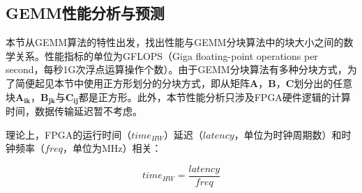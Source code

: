 \subsection{GEMM性能分析与预测}\label{subsec:predict}

本节从GEMM算法的特性出发，找出性能与GEMM分块算法中的块大小之间的数学关系。性能指标的单位为GFLOPS（Giga floating-point operations per second，每秒1G次浮点运算操作个数）。由于GEMM分块算法有多种分块方式，为了简便起见本节中使用正方形划分的分块方式，即从矩阵$\mathbf{A}$，$\mathbf{B}$，$\mathbf{C}$划分出的任意块$\mathbf{A_{ik}}$，$\mathbf{B_{jk}}$与$\mathbf{C_{ij}}$都是正方形。此外，本节性能分析只涉及FPGA硬件逻辑的计算时间，数据传输延迟暂不考虑。

理论上，FPGA的运行时间（$time_{HW}$）延迟（$latency$，单位为时钟周期数）和时钟频率（$freq$，单位为MHz）相关：

\begin{equation}\label{eq:timelatency}
time_{HW}=\frac{latency}{freq}
\end{equation}

